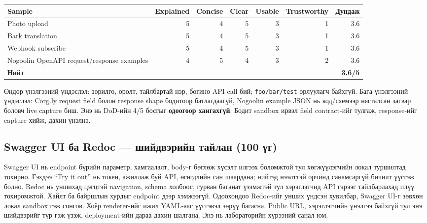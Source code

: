 \documentclass[
  mongolian,
]{article}
\begin{document}
\begingroup\footnotesize\setlength{\tabcolsep}{2pt}

\begin{longtable}[]{@{}lrrrrrr@{}}
\toprule\noalign{}
Sample & Explained & Concise & Clear & Usable & Trustworthy & Дундаж \\
\midrule\noalign{}
\endhead
\bottomrule\noalign{}
\endlastfoot
Photo upload & 5 & 4 & 5 & 3 & 1 & 3.6 \\
Bark translation & 5 & 4 & 5 & 3 & 1 & 3.6 \\
Webhook subscribe & 5 & 4 & 5 & 3 & 1 & 3.6 \\
Nogoolin OpenAPI request/response examples & 4 & 5 & 4 & 3 & 2 & 3.6 \\
\textbf{Нийт} & & & & & & \textbf{3.6/5} \\
\end{longtable}

\endgroup

Өндөр үнэлгээний үндэслэл: зорилго, оролт, тайлбартай нэр, богино API
call бий; \texttt{foo/bar/test} орлуулагч байхгүй. Бага үнэлгээний
үндэслэл: Corg.ly request field болон response shape бодитоор
батлагдаагүй, Nogoolin example JSON нь код/схемээр нягталсан загвар
боловч live capture биш. Энэ нь DoD-ийн 4/5 босгыг \textbf{одоогоор
хангахгүй}. Бодит sandbox ирвэл field contract-ийг тулгаж, response-ийг
capture хийж, дахин үнэлнэ.

\subsection{Swagger UI ба Redoc --- шийдвэрийн тайлан (100
үг)}\label{swagger-ui-ux431ux430-redoc-ux448ux438ux439ux434ux432ux44dux440ux438ux439ux43d-ux442ux430ux439ux43bux430ux43d-100-ux4afux433}

Swagger UI нь endpoint бүрийн параметр, хамгаалалт, body-г бөглөж хүсэлт
илгээх боломжтой тул хөгжүүлэгчийн локал туршилтад тохирно. Гэхдээ ``Try
it out'' нь токен, ажиллаж буй API, өгөгдлийн сан шаардана; нийтэд
нээлттэй орчинд санамсаргүй бичилт үүсгэж болно. Redoc нь уншихад
цэгцтэй navigation, schema холбоос, гурван баганат үзэмжтэй тул
хэрэглэгчид API гэрээг тайлбарлахад илүү тохиромжтой. Хайлт ба байршлын
хурдыг endpoint дээр хэмжээгүй. Одоохондоо Redoc-ийг унших үндсэн
хувилбар, Swagger UI-г зөвхөн локал sandbox гэж сонгов. Хоёр
renderer-ийг ижил YAML-аас үүсгэвэл зөрүү багасна. Public URL,
хэрэглэгчийн үнэлгээ байхгүй тул энэ шийдвэрийг түр гэж үзэж,
deployment-ийн дараа дахин шалгана. Энэ нь лабораторийн хүрээний санал
юм.
\end{document}
